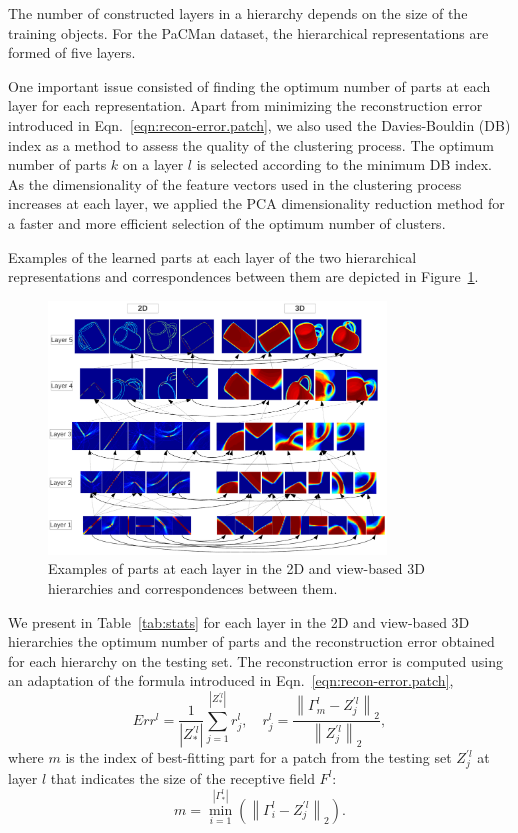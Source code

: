 \documentclass[runningheads]{llncs}
\begin{document}
The number of constructed layers in a hierarchy depends on the size of the training objects. For the PaCMan dataset, the hierarchical representations are formed of five layers. 

One important issue consisted of finding the optimum number of parts at each layer for each representation. Apart from minimizing the reconstruction error introduced in Eqn.~\ref{eqn:recon-error.patch}, we also used the Davies-Bouldin (DB) index \cite{Bouldin97} as a method to assess the quality of the clustering process. The optimum number of parts $k$ on a layer $l$ is selected according to the minimum DB index. As the dimensionality of the feature vectors used in the clustering process increases at each layer, we applied the PCA dimensionality reduction method for a faster and more efficient selection of the optimum number of clusters.

Examples of the learned parts at each layer of the two hierarchical representations and correspondences between them are depicted in Figure~\ref{hierarchy}.

\begin{figure}
\begin{center}
\includegraphics[width=0.8\textwidth]{hierarchy}
\end{center}
\caption{Examples of parts at each layer in the 2D and view-based 3D hierarchies and correspondences between them.}
\label{hierarchy}
\end{figure}

We present in Table~\ref{tab:stats} for each layer in the 2D and view-based 3D hierarchies the optimum number of parts and the reconstruction error obtained for each hierarchy on the testing set. The reconstruction error is computed using an adaptation of the formula introduced in Eqn.~\ref{eqn:recon-error.patch},
\begin{equation}
 Err^l = \frac{1}{|Z_*^{'l}|} \sum_{j=1}^{|Z_*^{'l}|} r_j^l,\quad
 r_j^l = \frac{\left\|\Gamma_m^l-Z_j^{'l}\right\|_2}{\left\|Z_j^{'l}\right\|_2},
 \label{eq:r}
\end{equation}
where $m$ is the index of best-fitting part for a patch from the testing set $Z_j^{'l}$ at layer $l$ that indicates the size of the receptive field $F^l$:
 \begin{equation}
 m=\min_{i=1}^{|\Gamma_*^l|}(\left\|\Gamma_i^l-Z_j^{'l}\right\|_2).
\end{equation}
\end{document}
